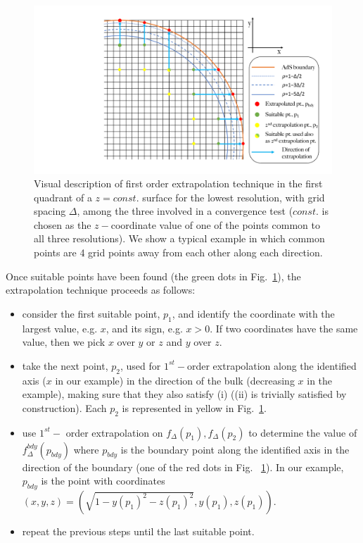 \documentclass[12pt]{iopart} %
\begin{document}
\begin{figure}[h]
        \centering
        \includegraphics[width=6.0in,clip=true]{plots/lego_circle/Lego_circle.pdf}
\parbox{5.0in}{\caption{Visual description of first order extrapolation technique in the first quadrant of a $z=const.$ surface for the lowest resolution, with grid spacing $\Delta$, among the three involved in a convergence test ($const.$ is chosen as the $z-$coordinate value of one of the points common to all three resolutions). We show a typical example in which common points are 4 grid points away from each other along each direction.
        }\label{fig:lego_circle}}
\end{figure}
 
Once suitable points have been found (the green dots in Fig.~\ref{fig:lego_circle}), the extrapolation technique proceeds as follows:
 \begin{itemize}
 \item consider the first suitable point, $p_1$, and identify the coordinate with the largest value, e.g. $x$, and its sign, e.g. $x>0$. If two coordinates have the same value, then we pick $x$ over $y$ or $z$ and $y$ over $z$.
 \item take the next point, $p_2$, used for $1^{st}-$order extrapolation along the identified axis ($x$ in our example) in the direction of the bulk (decreasing $x$ in the example), making sure that they also satisfy (i) ((ii) is trivially satisfied by construction). Each $p_2$ is represented in yellow in Fig.~\ref{fig:lego_circle}.
 \item use $1^{st}-$ order extrapolation on $f_\Delta(p_1),f_\Delta(p_{2})$ to determine the value of $f^{bdy}_{\Delta}(p_{bdy})$ where $p_{bdy}$ is the boundary point along the identified axis in the direction of the boundary (one of the red dots in Fig. ~\ref{fig:lego_circle}). In our example, $p_{bdy}$ is the point with coordinates $(x,y,z)=(\sqrt{1-y(p_1)^2-z(p_1)^2},y(p_1),z(p_1))$.
 \item repeat the previous steps until the last suitable point.
 \end{itemize}
\end{document}
